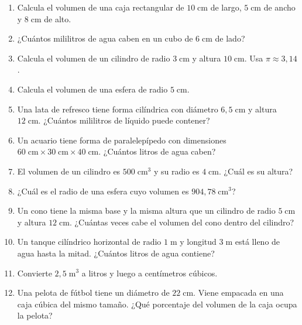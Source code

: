 \documentclass[12pt, letterpaper]{article}
\begin{document}
\begin{enumerate}[leftmargin=*, resume]
  \item \facil{} Calcula el volumen de una caja rectangular de $10\;\text{cm}$ de largo, $5\;\text{cm}$ de ancho y $8\;\text{cm}$ de alto.

  \item \facil{} ¿Cuántos mililitros de agua caben en un cubo de $6\;\text{cm}$ de lado?

  \item \facil{} Calcula el volumen de un cilindro de radio $3\;\text{cm}$ y altura $10\;\text{cm}$. Usa $\pi \approx 3{,}14$.

  \item \facil{} Calcula el volumen de una esfera de radio $5\;\text{cm}$.

  \item \medio{} Una lata de refresco tiene forma cilíndrica con diámetro $6{,}5\;\text{cm}$ y altura $12\;\text{cm}$. ¿Cuántos mililitros de líquido puede contener?

  \item \medio{} Un acuario tiene forma de paralelepípedo con dimensiones $60\;\text{cm} \times 30\;\text{cm} \times 40\;\text{cm}$. ¿Cuántos litros de agua caben?

  \item \medio{} El volumen de un cilindro es $500\;\text{cm}^3$ y su radio es $4\;\text{cm}$. ¿Cuál es su altura?

  \item \medio{} ¿Cuál es el radio de una esfera cuyo volumen es $904{,}78\;\text{cm}^3$?

  \item \dificil{} Un cono tiene la misma base y la misma altura que un cilindro de radio $5\;\text{cm}$ y altura $12\;\text{cm}$. ¿Cuántas veces cabe el volumen del cono dentro del cilindro?

  \item \dificil{} Un tanque cilíndrico horizontal de radio $1\;\text{m}$ y longitud $3\;\text{m}$ está lleno de agua hasta la mitad. ¿Cuántos litros de agua contiene?

  \item \dificil{} Convierte $2{,}5\;\text{m}^3$ a litros y luego a centímetros cúbicos.

  \item \dificil{} Una pelota de fútbol tiene un diámetro de $22\;\text{cm}$. Viene empacada en una caja cúbica del mismo tamaño. ¿Qué porcentaje del volumen de la caja ocupa la pelota?
\end{enumerate}
\end{document}
